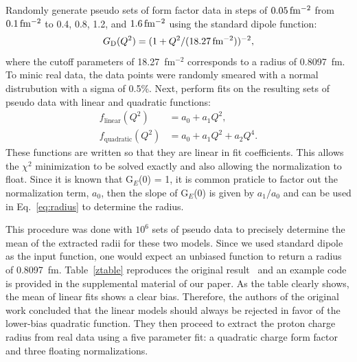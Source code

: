 \documentclass[10pt,aps,prc,twocolumn]{revtex4-1}
\begin{document}
Randomly generate pseudo sets of form factor data in steps 
of $\unit[0.05]{fm^{-2}}$ from $\unit[0.1]{fm^{-2}}$ to 0.4, 0.8, 1.2,
and $\unit[1.6]{fm^{-2}}$ using the standard dipole function:
\begin{equation}
\label{sd}
G\mathrm{_D}(Q^2) = ( 1 + Q^2/(\unit[18.27]{fm^{-2}}))^{-2},
\end{equation}
where the cutoff parameters of 18.27~fm$^{-2}$ corresponds to a radius of 0.8097~fm.
To minic real data, the data points were randomly smeared with a normal distrubution
with a sigma of 0.5\%.  
Next, perform fits on the resulting sets of pseudo data with linear and quadratic functions:
\begin{align}
f_{\mathrm{linear}}(Q^2) &  = a_0 + a_1 Q^2, \\
f_{\mathrm{quadratic}}(Q^2) & = a_0 + a_1 Q^2 + a_2 Q^4. 
\end{align}
These functions are written so that they are linear in fit coefficients.  
This allows the $\chi^2$ minimization to be solved exactly
and also allowing the normalization to float.   Since it is known that
G$_E$(0) = 1, it is common praticle to factor out the normalization term, $a_0$, 
then the slope of G$_E$(0) is given by $a_1/a_0$ and can be used in Eq.~\ref{eq:radius} 
to determine the radius.

This procedure was done with $10^6$ sets of pseudo data to 
precisely determine the mean of the extracted 
radii for these two models.   Since we used standard dipole as the input function, one would expect an unbiased 
function to return a radius of 0.8097~fm.
Table~\ref{ztable} reproduces the original result~\cite{Borkowski:1975} and
an example code is provided in the supplemental material of our paper.  
As the table clearly shows, the mean of linear fits shows a clear bias. 
Therefore, the authors of the original work concluded that the linear models 
should always be rejected in favor of the lower-bias quadratic function.
They then proceed to extract the proton charge radius from real data using a five parameter 
fit: a quadratic charge form factor and three floating normalizations.
\end{document}
